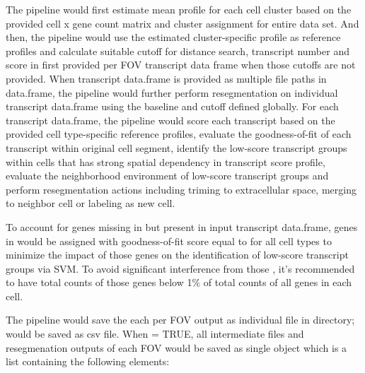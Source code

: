 \documentclass[letterpaper]{book}
\begin{document}
%
\begin{Details}
The pipeline would first estimate mean profile for each cell cluster based on the provided cell x gene count matrix and cluster assignment for entire data set.
And then, the pipeline would use the estimated cluster-specific profile as reference profiles and calculate suitable cutoff for distance search, transcript number and score in first provided per FOV transcript data frame when those cutoffs are not provided.
When transcript data.frame is provided as multiple file paths in  data.frame, the pipeline would further perform resegmentation on individual transcript data.frame using the baseline and cutoff defined globally.
For each transcript data.frame, the pipeline would score each transcript based on the provided cell type-specific reference profiles, evaluate the goodness-of-fit of each transcript within original cell segment,
identify the low-score transcript groups within cells that has strong spatial dependency in transcript score profile,
evaluate the neighborhood environment of low-score transcript groups and perform resegmentation actions including triming to extracellular space, merging to neighbor cell or labeling as new cell.

To account for genes missing in  but present in input transcript data.frame, genes in  would be assigned with goodness-of-fit score equal to  for all cell types to minimize the impact of those genes on the identification of low-score transcript groups via SVM. To avoid significant interference from those , it's recommended to have total counts of those genes below 1\% of total counts of all genes in each cell.

The pipeline would save the each per FOV output as individual file in  directory;  would be saved as csv file.
When  = TRUE, all intermediate files and resegmenation outputs of each FOV would be saved as single  object which is a list containing the following elements:
\begin{description}


\end{description}
\end{Details}
\end{document}
